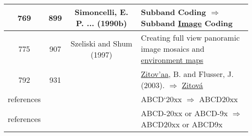 \documentclass[10pt]{article}
\begin{document}
\begin{tabular}{|c|c|c|l|}
769 & 899 & Simoncelli, E. P. ... (1990b) & Subband Coding $\Rightarrow$ Subband \underline{Image} Coding \\\hline
775 & 907 & Szeliski and Shum (1997) & Creating full view panoramic image mosaics and \underline{environment maps} \\\hline
792 & 931 & & \underline{Zitov'aa}, B. and Flusser, J. (2003). $\Rightarrow$ \underline{Zitov\'a} \\\hline
references & & & ABCD`20xx $\Rightarrow$ ABCD20xx \\\hline
references & & & ABCD-20xx or ABCD-9x $\Rightarrow$ ABCD20xx or ABCD9x \\\hline
\end{tabular}
\end{document}
